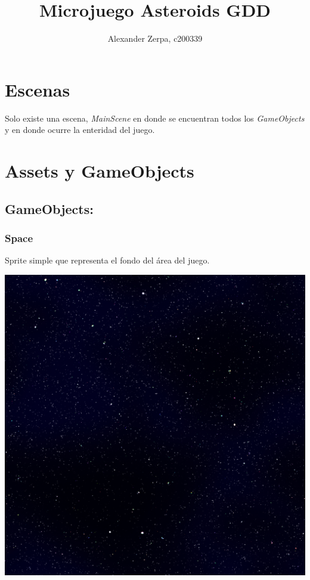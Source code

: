 \documentclass[journal]{IEEEtran}
\newenvironment{Figure}
  {\par\medskip\noindent\minipage{\linewidth}}
  {\endminipage\par\medskip}
\begin{document}
%
\title{Microjuego Asteroids GDD}
\author{Alexander Zerpa, c200339}
\maketitle

\section*{Escenas}

Solo existe una escena, \textit{MainScene} en donde se encuentran todos los
\textit{GameObjects} y en donde ocurre la enteridad del juego.


\section*{Assets y GameObjects}

\subsection*{GameObjects:}

\begin{multicols}{2}
  \subsubsection*{Space}
  Sprite simple que representa el fondo del área del juego.

  \vfill\null
  \columnbreak

  \begin{Figure}
    \centering
    \includegraphics[width=0.3\linewidth]{../Assets/Sprites/Space.jpg}
    \label{fig:SpaceSprite}
  \end{Figure}
  \vfill\null
\end{multicols}
\end{document}
